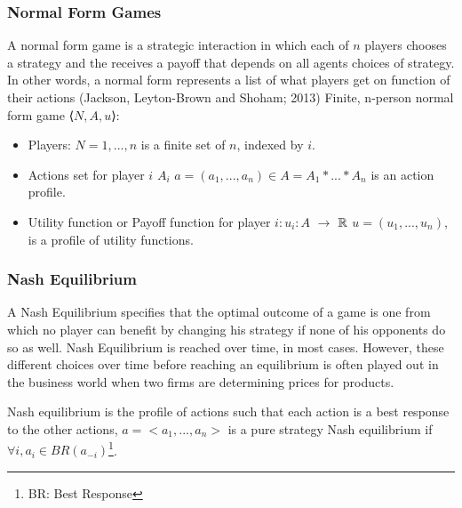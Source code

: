 \subsubsection{Normal Form Games}
A normal form game is a strategic interaction in which each of $n$ players chooses a strategy and the receives a payoff that depends on all agents choices of strategy. In other words, a normal form represents a list of what players get on function of their actions (Jackson, Leyton-Brown and Shoham; 2013)
Finite, n-person normal form game  ⟨$N, A, u$⟩:
\begin{itemize}
\item Players: $ N = {1, ... , n} $ is a finite set of $n$, indexed by $i$.
\item Actions set for player $i$ $A_i$
\subitem $a = (a_1,...,a_n) \in A = A_1 * ... * A_n $ is an action profile.
\item Utility function or Payoff function for player $i: u_i : A $  $\to$ ${\Bbb{R}}$
\subitem $u = (u_1,..., u_n)$, is a profile of utility functions.
\end{itemize}

\subsubsection{Nash Equilibrium}\label{subsection}
A Nash Equilibrium specifies that the optimal outcome of a game is one from which no player can benefit by changing his strategy if none of his opponents do so as well. Nash Equilibrium is reached  over time, in most cases. However, these different choices over time before reaching an equilibrium is often played out in the business world when two firms are determining prices for products.

\begin{mydef}\label{def:def1500}
Nash equilibrium is the profile of actions such that each action is a best response to the other actions,
$a = <a_1,...,a_n>$ is a pure strategy Nash equilibrium if $\forall i, a_i \in BR(a_{-i})$\footnote{BR: Best Response}.
\end{mydef}

